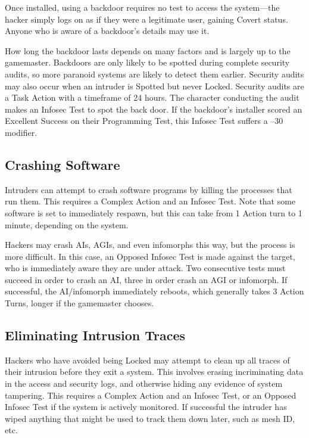 Once installed, using a backdoor requires no test to access the system—the hacker simply logs on as if they were a legitimate user, gaining Covert status. Anyone who is aware of a backdoor's details may use it. 

How long the backdoor lasts depends on many factors and is largely up to the gamemaster. Backdoors are only likely to be spotted during complete security audits, so more paranoid systems are likely to detect them earlier. Security audits may also occur when an intruder is Spotted but never Locked. Security audits are a Task Action with a timeframe of 24 hours. The character conducting the audit makes an Infosec Test to spot the back door. If the backdoor's installer scored an Excellent Success on their Programming Test, this Infosec Test suffers a –30 modifier. 

\subsection{Crashing Software} 

Intruders can attempt to crash software programs by killing the processes that run them. This requires a Complex Action and an Infosec Test. Note that some software is set to immediately respawn, but this can take from 1 Action turn to 1 minute, depending on the system. 

Hackers may crash AIs, AGIs, and even infomorphs this way, but the process is more difficult. In this case, an Opposed Infosec Test is made against the target, who is immediately aware they are under attack. Two consecutive tests must succeed in order to crash an AI, three in order crash an AGI or infomorph. If successful, the AI/infomorph immediately reboots, which generally takes 3 Action Turns, longer if the gamemaster chooses. 

\subsection{Eliminating Intrusion Traces} 

Hackers who have avoided being Locked may attempt to clean up all traces of their intrusion before they exit a system. This involves erasing incriminating data in the access and security logs, and otherwise hiding any evidence of system tampering. This requires a Complex Action and an Infosec Test, or an Opposed Infosec Test if the system is actively monitored. If successful the intruder has wiped anything that might be used to track them down later, such as mesh ID, etc. 

